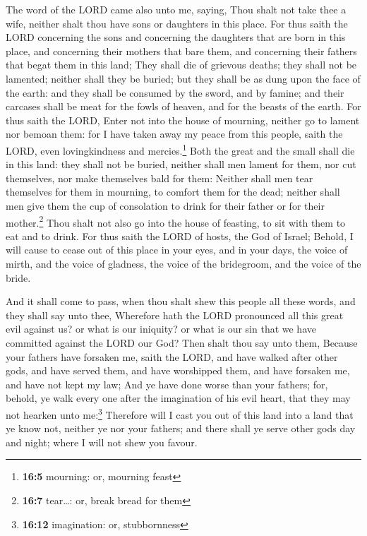  The word of the LORD came also unto me, saying,
 Thou shalt not take thee a wife, neither shalt thou have
sons or daughters in this place.  For thus saith the LORD
concerning the sons and concerning the daughters that are born in this
place, and concerning their mothers that bare them, and concerning their
fathers that begat them in this land;  They shall die of
grievous deaths; they shall not be lamented; neither shall they be
buried; but they shall be as dung upon the face of the earth: and they
shall be consumed by the sword, and by famine; and their carcases shall
be meat for the fowls of heaven, and for the beasts of the earth.
 For thus saith the LORD, Enter not into the house of
mourning, neither go to lament nor bemoan them: for I have taken away my
peace from this people, saith the LORD, even lovingkindness and
mercies.\footnote{\textbf{16:5} mourning: or, mourning feast}
 Both the great and the small shall die in this land: they
shall not be buried, neither shall men lament for them, nor cut
themselves, nor make themselves bald for them:  Neither
shall men tear themselves for them in mourning, to comfort them for the
dead; neither shall men give them the cup of consolation to drink for
their father or for their mother.\footnote{\textbf{16:7} tear\ldots: or,
  break bread for them}  Thou shalt not also go into the
house of feasting, to sit with them to eat and to drink. 
For thus saith the LORD of hosts, the God of Israel; Behold, I will
cause to cease out of this place in your eyes, and in your days, the
voice of mirth, and the voice of gladness, the voice of the bridegroom,
and the voice of the bride.

 And it shall come to pass, when thou shalt shew this
people all these words, and they shall say unto thee, Wherefore hath the
LORD pronounced all this great evil against us? or what is our iniquity?
or what is our sin that we have committed against the LORD our God?
 Then shalt thou say unto them, Because your fathers have
forsaken me, saith the LORD, and have walked after other gods, and have
served them, and have worshipped them, and have forsaken me, and have
not kept my law;  And ye have done worse than your
fathers; for, behold, ye walk every one after the imagination of his
evil heart, that they may not hearken unto me:\footnote{\textbf{16:12}
  imagination: or, stubbornness}  Therefore will I cast
you out of this land into a land that ye know not, neither ye nor your
fathers; and there shall ye serve other gods day and night; where I will
not shew you favour.

